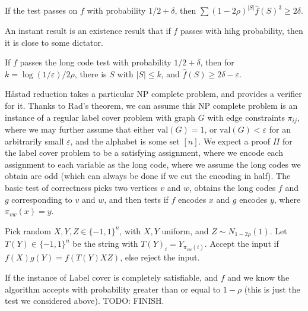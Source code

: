 \begin{theorem}
    If the test passes on $f$ with probability $1/2 + \delta$, then $\sum (1 - 2 \rho)^{|S|} \widehat{f}(S)^3 \geq 2 \delta$.
\end{theorem}

An instant result is an existence result that if $f$ passes with hihg probability, then it is close to some dictator.

\begin{corollary}
    If $f$ passes the long code test with probability $1/2 + \delta$, then for $k = \log(1/\varepsilon)/2\rho$, there is $S$ with $|S| \leq k$, and $\widehat{f}(S) \geq 2 \delta - \varepsilon$.
\end{corollary}

Håstad reduction takes a particular NP complete problem, and provides a verifier for it. Thanks to Rad's theorem, we can assume this NP complete problem is an instance of a regular label cover problem with graph $G$ with edge constraints $\pi_{ij}$, where we may further assume that either $\text{val}(G) = 1$, or $\text{val}(G) < \varepsilon$ for an arbitrarily small $\varepsilon$, and the alphabet is some set $[n]$. We expect a proof $\Pi$ for the label cover problem to be a satisfying assignment, where we encode each assignment to each variable as the long code, where we assume the long codes we obtain are odd (which can always be done if we cut the encoding in half). The basic test of correctness picks two vertices $v$ and $w$, obtains the long codes $f$ and $g$ corresponding to $v$ and $w$, and then tests if $f$ encodes $x$ and $g$ encodes $y$, where $\pi_{vw}(x) = y$.

\begin{algorithm}[H]
\renewcommand{\thealgorithm}{}
\caption{}
\label{protocol1}
\begin{algorithmic}[1]
\STATE Pick random $X,Y,Z \in \{ -1, 1 \}^n$, with $X,Y$ uniform, and $Z \sim N_{1-2\rho}(1)$.
\STATE Let $T(Y) \in \{ -1, 1 \}^n$ be the string with $T(Y)_i = Y_{\pi_{vw}(i)}$.
\STATE Accept the input if $f(X)g(Y) = f(T(Y)XZ)$, else reject the input.
\end{algorithmic}
\end{algorithm} 

If the instance of Label cover is completely satisfiable, and $f$ and we know the algorithm accepts with probability greater than or equal to $1 - \rho$ (this is just the test we considered above). TODO: FINISH.



